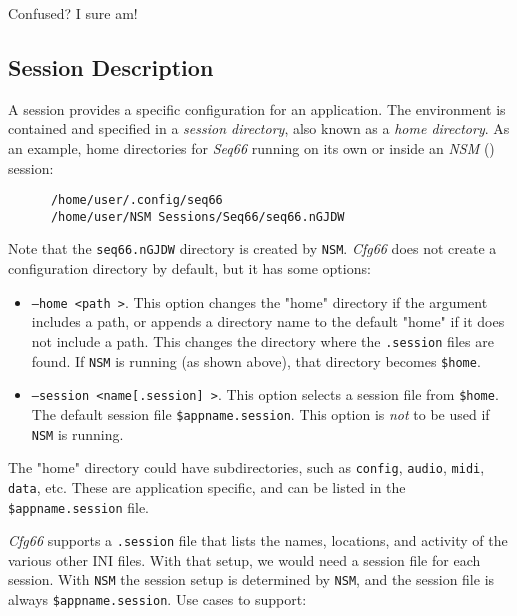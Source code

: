    Confused? I sure am!

\subsection{Session Description}
\label{subsec:session_description}

   A session provides a specific configuration for an application.
   The environment is contained and specified in a
   \textsl{session directory}, also known as a
   \textsl{home directory}.
   As an example, home directories for \textsl{Seq66} running on its
   own or inside an \textsl{NSM} (\cite{nsm}) session:

   \begin{verbatim}
      /home/user/.config/seq66
      /home/user/NSM Sessions/Seq66/seq66.nGJDW
   \end{verbatim}

   Note that the \texttt{seq66.nGJDW} directory is created by \texttt{NSM}.
   \textsl{Cfg66} does not create a configuration directory by default, 
   but it has some options:

   \begin{itemize}
      \item \texttt{--home \textless path \textgreater}.
         This option changes the "home" directory if the argument includes 
         a path, or appends a directory name to the default "home" if it
         does not include a path.
         This changes the directory where the \texttt{.session} files are
         found.
         If \texttt{NSM} is running (as shown above), that directory
         becomes \texttt{\$home}.
      \item \texttt{--session \textless name[.session] \textgreater}.
         This option selects a session file from \texttt{\$home}.
         The default session file \texttt{\$appname.session}.
         This option is \textsl{not} to be used if \texttt{NSM} is running.
   \end{itemize}

   The "home" directory could have subdirectories, such as
   \texttt{config}, \texttt{audio}, \texttt{midi}, \texttt{data}, etc.
   These are application specific, and can be listed in the 
   \texttt{\$appname.session} file.

   \textsl{Cfg66} supports a \texttt{.session} file that lists
   the names, locations, and activity of the various other INI files.
   With that setup, we would need a session file for each session.
   With \texttt{NSM} the session setup is determined by
   \texttt{NSM}, and the session file is always \texttt{\$appname.session}.
   Use cases to support:

